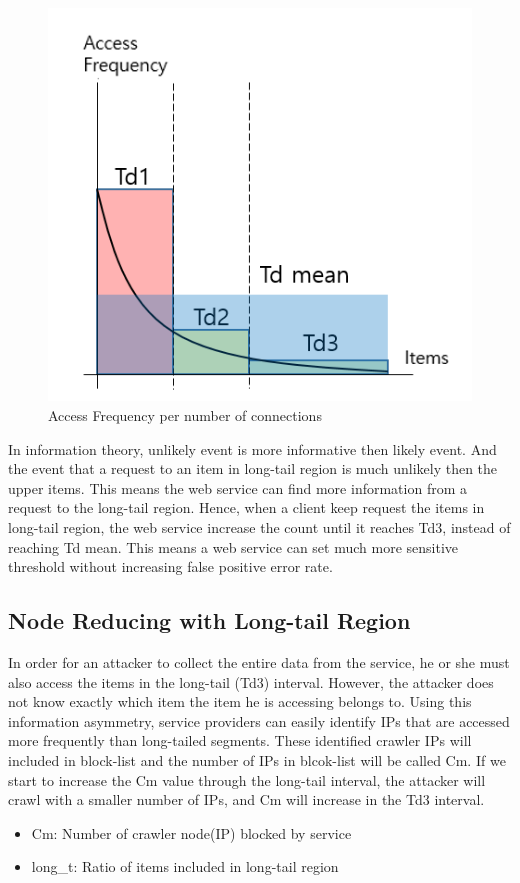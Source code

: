 \documentclass[sigconf,anonymous=true]{acmart}
\begin{document}
\begin{figure}[H]
    \includegraphics[width=0.7\columnwidth]{figs/figure_01.png}
    \caption{Access Frequency per number of connections}
    \label{fig:fig1}
\end{figure}

In information theory, unlikely event is more informative then likely event. And the event that a request to an item in long-tail region is much unlikely then the upper items. This means the web service can find more information from a request to the long-tail region.
Hence, when a client keep request the items in long-tail region, the web service increase the count until it reaches Td3, instead of reaching Td mean. This means a web service can set much more sensitive threshold without increasing false positive error rate.


\subsection{Node Reducing with Long-tail Region}
In order for an attacker to collect the entire data from the service, he or she must also access the items in the long-tail (Td3) interval. However, the attacker does not know exactly which item the item he is accessing belongs to. Using this information asymmetry, service providers can easily identify IPs that are accessed more frequently than long-tailed segments. These identified crawler IPs will included in block-list and the number of IPs in blcok-list will be called Cm. If we start to increase the Cm value through the long-tail interval, the attacker will crawl with a smaller number of IPs, and Cm will increase in the Td3 interval.

\begin{itemize}
\item Cm: Number of crawler node(IP) blocked by service
\item long\_t: Ratio of items included in long-tail region
\end{itemize}
\end{document}
